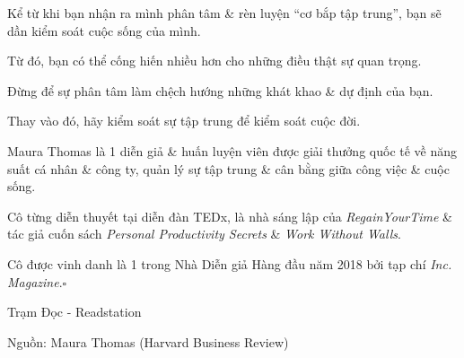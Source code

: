 \documentclass{article}
\begin{document}
Kể từ khi bạn nhận ra mình phân tâm \& rèn luyện ``cơ bắp tập trung'', bạn sẽ dần kiểm soát cuộc sống của mình.

Từ đó, bạn có thể cống hiến nhiều hơn cho những điều thật sự quan trọng.

Đừng để sự phân tâm làm chệch hướng những khát khao \& dự định của bạn.

Thay vào đó, hãy kiểm soát sự tập trung để kiểm soát cuộc đời.

%
Maura Thomas là 1 diễn giả \& huấn luyện viên được giải thưởng quốc tế về năng suất cá nhân \& công ty, quản lý sự tập trung \& cân bằng giữa công việc \& cuộc sống.

Cô từng diễn thuyết tại diễn đàn TEDx, là nhà sáng lập của \textit{RegainYourTime} \& tác giả cuốn sách \textit{Personal Productivity Secrets} \& \textit{Work Without Walls}.

Cô được vinh danh là 1 trong Nhà Diễn giả Hàng đầu năm 2018 bởi tạp chí \textit{Inc. Magazine}.\hfill$\square$
\begin{flushright}
	Trạm Đọc - Readstation
	
	Nguồn: Maura Thomas (Harvard Business Review)
\end{flushright}

\end{document}

